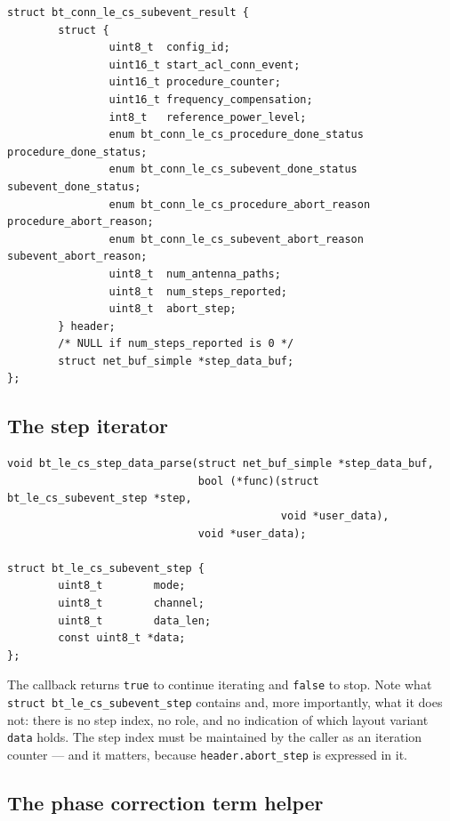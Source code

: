 \documentclass[11pt,a4paper]{article}
\newcommand{\code}[1]{\texttt{\small #1}}
\begin{document}
\begin{lstlisting}
struct bt_conn_le_cs_subevent_result {
        struct {
                uint8_t  config_id;
                uint16_t start_acl_conn_event;
                uint16_t procedure_counter;
                uint16_t frequency_compensation;
                int8_t   reference_power_level;
                enum bt_conn_le_cs_procedure_done_status  procedure_done_status;
                enum bt_conn_le_cs_subevent_done_status   subevent_done_status;
                enum bt_conn_le_cs_procedure_abort_reason procedure_abort_reason;
                enum bt_conn_le_cs_subevent_abort_reason  subevent_abort_reason;
                uint8_t  num_antenna_paths;
                uint8_t  num_steps_reported;
                uint8_t  abort_step;
        } header;
        /* NULL if num_steps_reported is 0 */
        struct net_buf_simple *step_data_buf;
};
\end{lstlisting}

\subsection{The step iterator}

\begin{lstlisting}
void bt_le_cs_step_data_parse(struct net_buf_simple *step_data_buf,
                              bool (*func)(struct bt_le_cs_subevent_step *step,
                                           void *user_data),
                              void *user_data);

struct bt_le_cs_subevent_step {
        uint8_t        mode;
        uint8_t        channel;
        uint8_t        data_len;
        const uint8_t *data;
};
\end{lstlisting}

The callback returns \code{true} to continue iterating and \code{false} to stop. Note what
\code{struct bt\_\allowbreak{}le\_\allowbreak{}cs\_\allowbreak{}subevent\_\allowbreak{}step} contains and, more importantly, what it does not: there is
no step index, no role, and no indication of which layout variant \code{data} holds. The step index
must be maintained by the caller as an iteration counter --- and it matters, because
\code{header.abort\_\allowbreak{}step} is expressed in it.

\subsection{The phase correction term helper}
\end{document}
